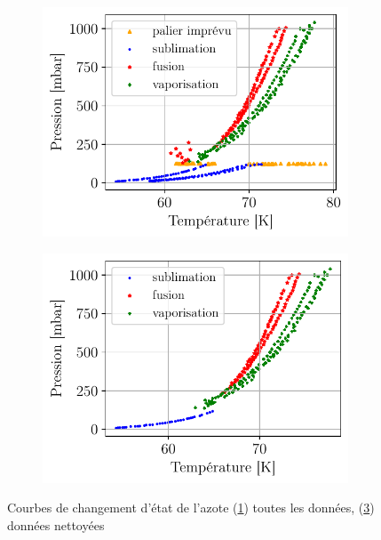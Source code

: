 \begin{figure}[h]
    \centering
    \begin{subfigure}[c]{0.5\linewidth}
        \centering
        \includegraphics[width=\linewidth]{figures/etats_azote_all_data.pdf}
        \caption{}
        \label{fig:alldata}
    \end{subfigure}%
    \begin{subfigure}[c]{0.5\linewidth}
        \centering
        \includegraphics[width=\linewidth]{figures/etats_azote_clean.pdf}
        \caption{}
        \label{fig:cleandata}
    \end{subfigure}
    \caption{Courbes de changement d'état de l'azote (\ref{fig:alldata}) toutes les données, (\ref{fig:cleandata}) données nettoyées}
\end{figure}

